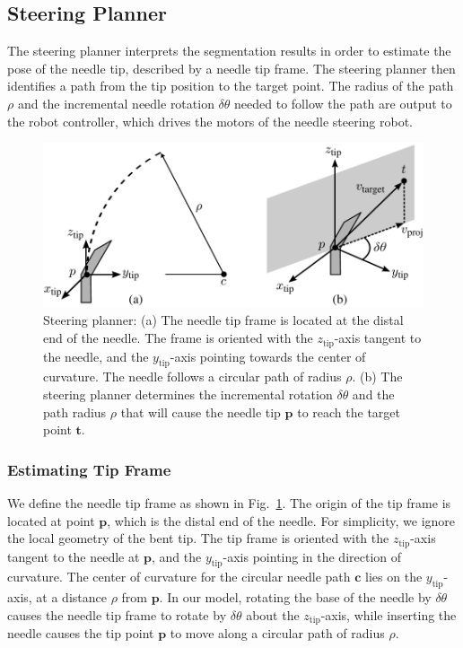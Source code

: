 \subsection{Steering Planner}
The steering planner interprets the segmentation results in order to estimate the pose of the needle tip, described by a needle tip frame. The steering planner then identifies a path from the tip position to the target point. The radius of the path $\rho$ and the incremental needle rotation $\delta\theta$ needed to follow the path are output to the robot controller, which drives the motors of the needle steering robot.

\begin{figure}[!t]
\centering
\includegraphics[width = \columnwidth]{Images/Chapter2/ControlAlgorithm/ControlAlgorithm}%
\caption{Steering planner: (a) The needle tip frame is located at the distal end of the needle. The frame is oriented with the $z_{\text{tip}}$-axis tangent to the needle, and the $y_{\text{tip}}$-axis pointing towards the center of curvature. The needle follows a circular path of radius $\rho$. (b) The steering planner determines the incremental rotation $\delta\theta$ and the path radius $\rho$ that will cause the needle tip $\bm{p}$ to reach the target point $\bm{t}$.  }
\label{fig:ControlAlgorithm}
\end{figure}

\subsubsection{Estimating Tip Frame}
We define the needle tip frame as shown in Fig.~\ref{fig:ControlAlgorithm}. The origin of the tip frame is located at point $\bm{p}$, which is the distal end of the needle. For simplicity, we ignore the local geometry of the bent tip. The tip frame is oriented with the $z_{\text{tip}}$-axis tangent to the needle at $\bm{p}$, and the $y_{\text{tip}}$-axis pointing in the direction of curvature. The center of curvature for the circular needle path $\bm{c}$ lies on the $y_{\text{tip}}$-axis, at a distance $\rho$ from $\bm{p}$. In our model, rotating the base of the needle by $\delta\theta$ causes the needle tip frame to rotate by $\delta\theta$ about the $z_{\text{tip}}$-axis, while inserting the needle causes the tip point $\bm{p}$ to move along  a circular path of radius $\rho$.


